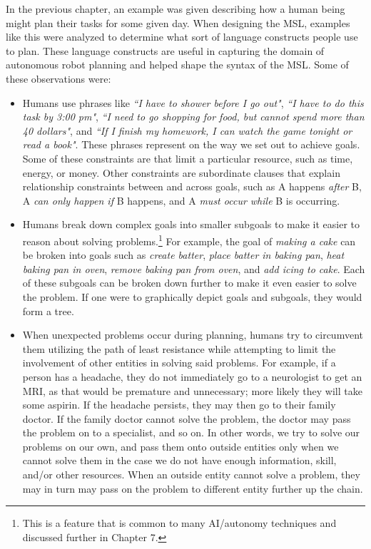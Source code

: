 In the previous chapter, an example was given describing how a human being might plan their tasks for some given day. When designing the MSL, examples like this were analyzed to determine what sort of language constructs people use to plan. These language constructs are useful in capturing the domain of autonomous robot planning and helped shape the syntax of the MSL. Some of these observations were:
\begin{itemize}
\item Humans use phrases like \textit{``I have to shower before I go out"}, \textit{``I have to do this task by 3:00 pm"}, \textit{``I need to go shopping for food, but cannot spend more than 40 dollars"}, and \textit{``If I finish my homework, I can watch the game tonight or read a book"}. These phrases represent  on the way we set out to achieve goals. Some of these constraints are  that limit a particular resource, such as time, energy, or money. Other constraints are subordinate clauses that explain relationship constraints between and across goals, such as A happens \textit{after} B, A \textit{can only happen if} B happens, and A \textit{must occur while} B is occurring.
\item Humans break down complex goals into smaller subgoals to make it easier to reason about solving problems.\footnote{This is a feature that is common to many AI/autonomy techniques and discussed further in Chapter 7.} For example, the goal of \textit{making a cake} can be broken into goals such as \textit{create batter}, \textit{place batter in baking pan}, \textit{heat baking pan in oven}, \textit{remove baking pan from oven}, and \textit{add icing to cake}. Each of these subgoals can be broken down further to make it even easier to solve the problem. If one were to graphically depict goals and subgoals, they would form a tree.
\item When unexpected problems occur during planning, humans try to circumvent them utilizing the path of least resistance while attempting to limit the involvement of other entities in solving said problems. For example, if a person has a headache, they do not immediately go to a neurologist to get an MRI, as that would be premature and unnecessary; more likely they will take some aspirin. If the headache persists, they may then go to their family doctor. If the family doctor cannot solve the problem, the doctor may pass the problem on to a specialist, and so on. In other words, we try to solve our problems on our own, and pass them onto outside entities only when we cannot solve them in the case we do not have enough information, skill, and/or other resources. When an outside entity cannot solve a problem, they may in turn may pass on the problem to different entity further up the chain.

\end{itemize}

